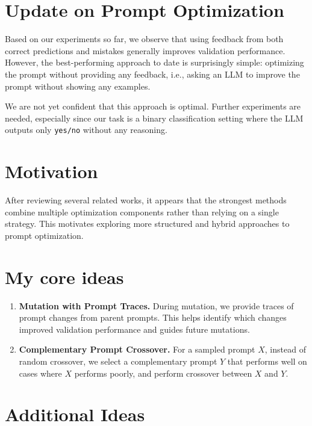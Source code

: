 \documentclass[12pt]{article}
\begin{document}
\section{Update on Prompt Optimization}

Based on our experiments so far, we observe that using feedback from both correct predictions and mistakes generally improves validation performance. However, the best-performing approach to date is surprisingly simple: optimizing the prompt without providing any feedback, i.e., asking an LLM to improve the prompt without showing any examples.

We are not yet confident that this approach is optimal. Further experiments are needed, especially since our task is a binary classification setting where the LLM outputs only \texttt{yes/no} without any reasoning.

\section{Motivation}

After reviewing several related works, it appears that the strongest methods combine multiple optimization components rather than relying on a single strategy. This motivates exploring more structured and hybrid approaches to prompt optimization.

\section{My core ideas}

\begin{enumerate}
    \item \textbf{Mutation with Prompt Traces.}  
    During mutation, we provide traces of prompt changes from parent prompts. This helps identify which changes improved validation performance and guides future mutations.

    \item \textbf{Complementary Prompt Crossover.}  
    For a sampled prompt $X$, instead of random crossover, we select a complementary prompt $Y$ that performs well on cases where $X$ performs poorly, and perform crossover between $X$ and $Y$.
\end{enumerate}

\section{Additional Ideas}
\end{document}
